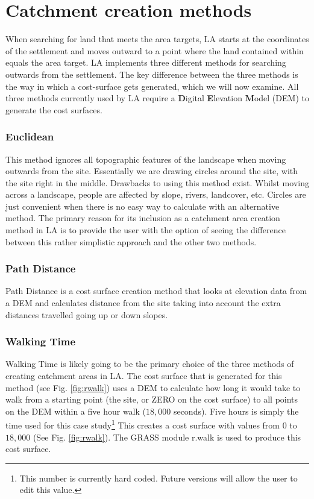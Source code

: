 \section{Catchment creation methods} 

When searching for land that meets the area targets, LA starts at
the coordinates of the settlement and moves outward to a point where the land
contained within equals the area target.  LA implements three
different methods for searching outwards from the settlement.  The key
difference between the three methods is the way in which a cost-surface gets
generated, which we will now examine.  All three methods currently used by LA
require a \textbf{D}igital \textbf{E}levation \textbf{M}odel (DEM) to generate
the cost surfaces.



  \subsubsection{Euclidean} \label{subsection:Euclidean} 
  
  This method ignores all topographic features of the landscape when moving
  outwards from the site.  Essentially we are drawing circles around the site,
  with the site right in the middle.  Drawbacks to using this method exist.
  Whilst moving across a landscape, people are affected by slope, rivers,
  landcover, etc.  Circles are just convenient when there is no easy way to
  calculate with an alternative method.  The primary reason for its inclusion
  as a catchment area creation method in LA is to provide the user
  with the option of seeing the difference between this rather simplistic
  approach and the other two methods.

  \subsubsection{Path Distance}
  
  Path Distance is a cost surface creation method that looks at elevation data
  from a DEM and calculates distance from the site taking into account the
  extra distances travelled going up or down slopes.

  \subsubsection{Walking Time}
  
  Walking Time is likely going to be the primary choice of the three methods of
  creating catchment areas in LA.  The cost surface that is
  generated for this method (see Fig. \ref{fig:rwalk}) uses a DEM to calculate
  how long it would take to walk from a starting point (the site, or ZERO on
  the cost surface) to all points on the DEM within a five hour walk ($18,000$
  seconds). Five hours is simply the time used for this case
  study\footnote{This number is currently hard coded. Future versions will
  allow the user to edit this value.} This creates a cost surface with values
  from $0$ to $18,000$ (See Fig. \ref{fig:rwalk}).  The GRASS module r.walk is
  used to produce this cost surface.

